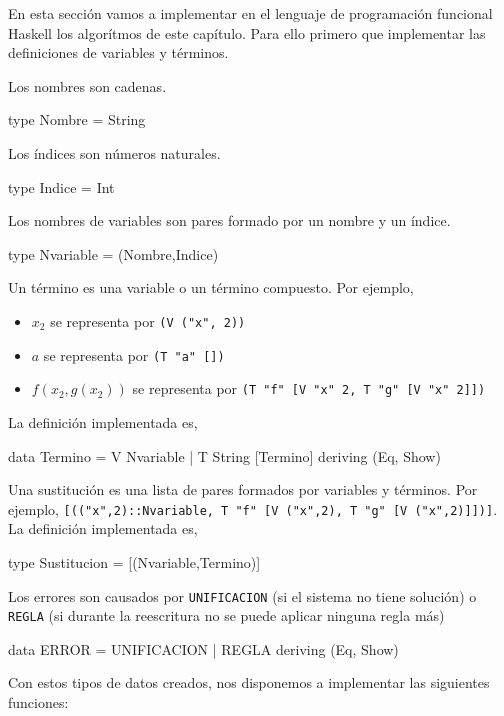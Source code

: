 En esta sección vamos a implementar en el lenguaje de programación
funcional Haskell los algorítmos de este capítulo. Para ello primero
que implementar las definiciones de variables y términos.

Los nombres son cadenas.
\begin{preludio}
type Nombre = String
\end{preludio}

Los índices son números naturales.
\begin{preludio}
type Indice = Int
\end{preludio}

Los nombres de variables son pares formado por un nombre y un índice.
\begin{preludio}
type Nvariable = (Nombre,Indice)
\end{preludio}

Un término es una variable o un término compuesto. Por ejemplo,
\begin{itemize}
\item $x_2$ se representa por \texttt{(V ("x", 2))}
\item $a$           se representa por \texttt{(T "a" [])}
\item $f(x_2,g(x_2))$ se representa por \texttt{(T "f" [V "x" 2, T "g" [V "x" 2]])}
\end{itemize}
La definición implementada es,
\begin{preludio}
data Termino = V Nvariable
             | T String [Termino]
             deriving (Eq, Show)
\end{preludio}

Una sustitución es una lista de pares formados por variables y
términos. Por ejemplo, \texttt{[(("x",2)::Nvariable, T "f" [V ("x",2),
  T "g" [V ("x",2)]])]}. La definición implementada es,

\begin{preludio}
type Sustitucion = [(Nvariable,Termino)]
\end{preludio}

Los errores son causados por \texttt{UNIFICACION} (si el sistema no
tiene solución) o \texttt{REGLA} (si durante la reescritura no se
puede aplicar ninguna regla más)
\begin{preludio}
data ERROR = UNIFICACION
           | REGLA
           deriving (Eq, Show)
\end{preludio}

Con estos tipos de datos creados, nos disponemos a implementar las
siguientes funciones:

